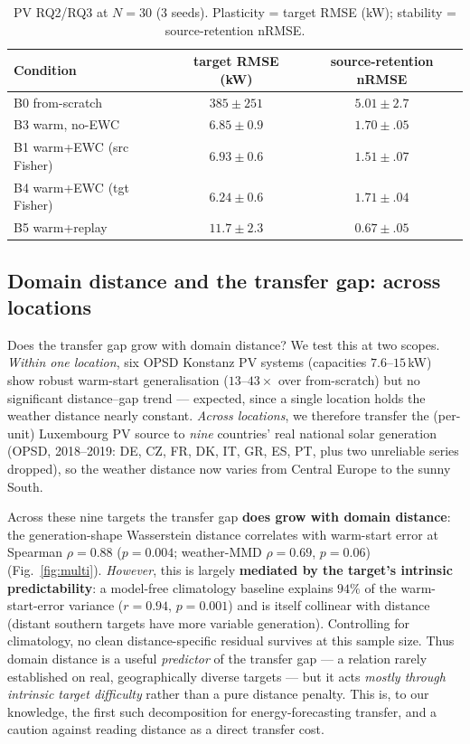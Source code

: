 \documentclass[conference]{IEEEtran}
\begin{document}
\begin{table}[t]
\centering
\caption{PV RQ2/RQ3 at $N{=}30$ (3 seeds). Plasticity = target RMSE (kW);
stability = source-retention nRMSE.}
\label{tab:pv}
\begin{tabular}{lcc}
\toprule
Condition & target RMSE (kW) & source-retention nRMSE\\
\midrule
B0 from-scratch          & $385\pm251$ & $5.01\pm2.7$\\
B3 warm, no-EWC          & $6.85\pm0.9$ & $1.70\pm.05$\\
B1 warm+EWC (src Fisher) & $6.93\pm0.6$ & $1.51\pm.07$\\
B4 warm+EWC (tgt Fisher) & $\mathbf{6.24\pm0.6}$ & $1.71\pm.04$\\
B5 warm+replay           & $11.7\pm2.3$ & $\mathbf{0.67\pm.05}$\\
\bottomrule
\end{tabular}
\end{table}

\subsection{Domain distance and the transfer gap: across locations}
Does the transfer gap grow with domain distance? We test this at two scopes.
\emph{Within one location}, six OPSD Konstanz PV systems (capacities
$7.6$--$15$\,kW) show robust warm-start generalisation ($13$--$43\times$ over
from-scratch) but no significant distance--gap trend --- expected, since a single
location holds the weather distance nearly constant. \emph{Across locations}, we
therefore transfer the (per-unit) Luxembourg PV source to \emph{nine} countries'
real national solar generation (OPSD, 2018--2019: DE, CZ, FR, DK, IT, GR, ES, PT,
plus two unreliable series dropped), so the weather distance now varies from
Central Europe to the sunny South.

Across these nine targets the transfer gap \textbf{does grow with domain distance}:
the generation-shape Wasserstein distance correlates with warm-start error at
Spearman $\rho{=}0.88$ ($p{=}0.004$; weather-MMD $\rho{=}0.69$, $p{=}0.06$)
(Fig.~\ref{fig:multi}). \emph{However}, this is largely \textbf{mediated by the
target's intrinsic predictability}: a model-free climatology baseline explains
$94\%$ of the warm-start-error variance ($r{=}0.94$, $p{=}0.001$) and is itself
collinear with distance (distant southern targets have more variable generation).
Controlling for climatology, no clean distance-specific residual survives at this
sample size. Thus domain distance is a useful \emph{predictor} of the transfer
gap --- a relation rarely established on real, geographically diverse targets ---
but it acts \emph{mostly through intrinsic target difficulty} rather than a pure
distance penalty. This is, to our knowledge, the first such decomposition for
energy-forecasting transfer, and a caution against reading distance as a direct
transfer cost.
\end{document}

